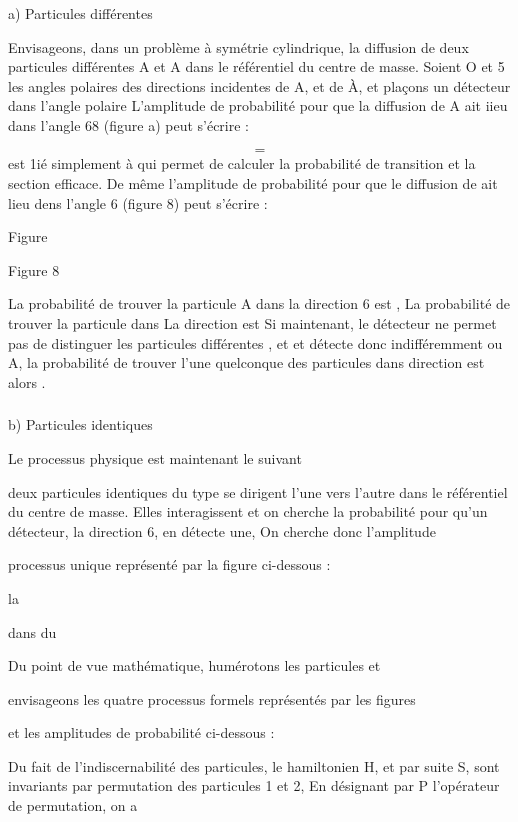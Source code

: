 \subsubsection{}%
a) Particules différentes

Envisageons, dans un problème à symétrie cylindrique, la diffusion de deux
particules différentes A et A dans le référentiel
du centre de masse. Soient O et 5 les angles polaires des directions
incidentes de A, et de À, et plaçons un détecteur dans l'angle polaire 
L'amplitude de probabilité pour que la diffusion de A ait iieu dans l'angle 68
(figure a) peut s'écrire :

\[
\tag{8}=
\]
 est 1ié simplement  à  qui permet de calculer la probabilité de transition et
 la section efficace.
De même l'amplitude de probabilité pour que le diffusion de
ait lieu dens l'angle 6 (figure 8) peut s'écrire :

Figure

Figure 8

La probabilité de trouver la particule A dans la
direction 6 est , La probabilité de trouver la particule  dans La direction  est
 Si maintenant,
le détecteur ne permet pas de distinguer les particules différentes , et  et
détecte donc indifféremment  ou A, la
probabilité de trouver l'une quelconque des particules dans
direction  est alors .
\subsubsection{}%
b) Particules identiques

Le processus physique est maintenant le suivant

deux particules identiques du type  se dirigent l'une vers
l'autre dans le référentiel du centre de masse. Elles interagissent et on cherche
la probabilité pour qu'un détecteur,
la direction 6, en détecte une, On cherche donc l'amplitude

processus unique représenté par la figure ci-dessous :

la

dans
du

 

Du point de vue mathématique, humérotons les particules et

envisageons les quatre processus formels représentés par les figures

et les amplitudes de probabilité ci-dessous :


Du fait de l'indiscernabilité des particules, le
hamiltonien H, et par suite S, sont invariants par permutation
des particules 1 et 2, En désignant par P l'opérateur de permutation, on a

